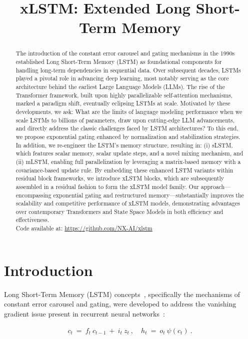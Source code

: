 \title{xLSTM: Extended Long Short-Term Memory}

\begin{abstract}
The introduction of the constant error carousel and gating mechanisms in the 1990s established Long Short-Term Memory (LSTM) as foundational components for handling long-term dependencies in sequential data. Over subsequent decades, LSTMs played a pivotal role in advancing deep learning, most notably serving as the core architecture behind the earliest Large Language Models (LLMs). The rise of the Transformer framework, built upon highly parallelizable self-attention mechanisms, marked a paradigm shift, eventually eclipsing LSTMs at scale. Motivated by these developments, we ask: What are the limits of language modeling performance when we scale LSTMs to billions of parameters, draw upon cutting-edge LLM advancements, and directly address the classic challenges faced by LSTM architectures? To this end, we propose exponential gating enhanced by normalization and stabilization strategies. In addition, we re-engineer the LSTM’s memory structure, resulting in: (i) sLSTM, which features scalar memory, scalar update steps, and a novel mixing mechanism, and (ii) mLSTM, enabling full parallelization by leveraging a matrix-based memory with a covariance-based update rule. By embedding these enhanced LSTM variants within residual block frameworks, we introduce xLSTM blocks, which are subsequently assembled in a residual fashion to form the xLSTM model family. Our approach—encompassing exponential gating and restructured memory—substantially improves the scalability and competitive performance of xLSTM models, demonstrating advantages over contemporary Transformers and State Space Models in both efficiency and effectiveness.\\
Code available at: \url{https://github.com/NX-AI/xlstm}
\end{abstract}

\section{Introduction}
\label{sec:intro}

Long Short-Term Memory (LSTM) concepts~\citep{Hochreiter:91,Hochreiter:97nips,Hochreiter:97}, specifically the mechanisms of constant error carousel and gating, were developed to address the vanishing gradient issue present in recurrent neural networks~\citep{Hochreiter:91,Hochreiter:00book}:

\begin{align}
\label{eq:lstm_idea}
  c_t \ = \ f_t \ c_{t-1} \ + \ 
          i_t \  z_t \ , \quad  
          h_t \ = \ o_t \ \psi({c_t}) \ . 
\end{align}

